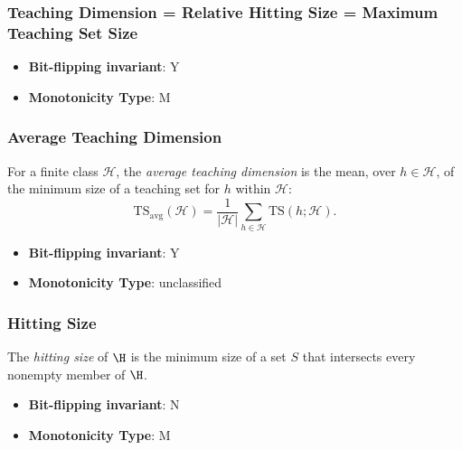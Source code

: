 \subsubsection{Teaching Dimension = Relative Hitting Size = Maximum Teaching Set Size}
      
      \begin{definition}[Teaching Dimension = Relative Hitting Size = Maximum Teaching Set Size - {\begin{tabular}{l}$\mathrm{TD} = \mathrm{RHT} = \mathrm{TS}_{\max}$\end{tabular}}]\label{def:teaching_dimension_=_relative_hitting_size_=_maximum_teaching_set_size}
      
      \end{definition}
      \begin{itemize}
      \item {\bf Bit-flipping invariant}: Y
      \item {\bf Monotonicity Type}: M
      \end{itemize}
\subsubsection{Average Teaching Dimension}
      
      \begin{definition}\label{def:average_teaching_dimension}
      For a finite class $\mathcal H$, the \emph{average teaching dimension}
      is the mean, over $h\in\mathcal H$, of the minimum size of a teaching
      set for $h$ within $\mathcal H$:
      \[
      \mathrm{TS}_{\mathrm{avg}}(\mathcal H)=\frac1{|\mathcal H|}
      \sum_{h\in\mathcal H}\mathrm{TS}(h;\mathcal H).
      \]
      \end{definition}
      \begin{itemize}
      \item {\bf Bit-flipping invariant}: Y
      \item {\bf Monotonicity Type}: unclassified
      \end{itemize}
\subsubsection{Hitting Size}
      
      \begin{definition}\label{def:hitting_size}
      The \emph{hitting size} of $\H$ is the minimum size of a set $S$ that intersects every nonempty member of $\H$.
      \end{definition}
      \begin{itemize}
      \item {\bf Bit-flipping invariant}: N
      \item {\bf Monotonicity Type}: M
      \end{itemize}
